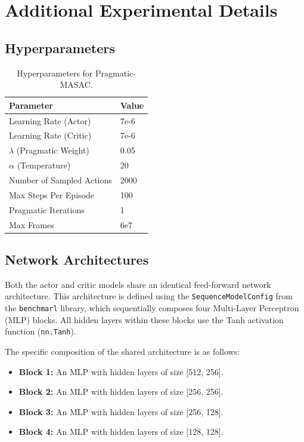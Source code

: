 \documentclass[12pt, a4paper]{report}
\begin{document}
\chapter{Additional Experimental Details}

\section{Hyperparameters}

\begin{table}[h]
     \centering
     \begin{tabular}{ll}
     \toprule
     \textbf{Parameter} & \textbf{Value} \\
     \midrule
     Learning Rate (Actor) & 7e-6 \\
     Learning Rate (Critic) & 7e-6 \\
     $\lambda$ (Pragmatic Weight) & 0.05 \\
     $\alpha$ (Temperature) & 20 \\
     Number of Sampled Actions & 2000 \\
     Max Steps Per Episode & 100 \\
     Pragmatic Iterations & 1 \\
     Max Frames & 6e7 \\
     \bottomrule
     \end{tabular}
     \caption{Hyperparameters for Pragmatic-MASAC.}
     \label{tab:hyperparams}
 \end{table}

\subsection{}

\section{Network Architectures}
\label{sec:network_architectures}

Both the actor and critic models share an identical feed-forward network architecture. This architecture is defined using the \texttt{SequenceModelConfig} from the \texttt{benchmarl} library, which sequentially composes four Multi-Layer Perceptron (MLP) blocks. All hidden layers within these blocks use the Tanh activation function (\texttt{nn.Tanh}).

The specific composition of the shared architecture is as follows:
\begin{itemize}
    \item \textbf{Block 1:} An MLP with hidden layers of size [512, 256].
    \item \textbf{Block 2:} An MLP with hidden layers of size [256, 256].
    \item \textbf{Block 3:} An MLP with hidden layers of size [256, 128].
    \item \textbf{Block 4:} An MLP with hidden layers of size [128, 128].
\end{itemize}
\end{document}
